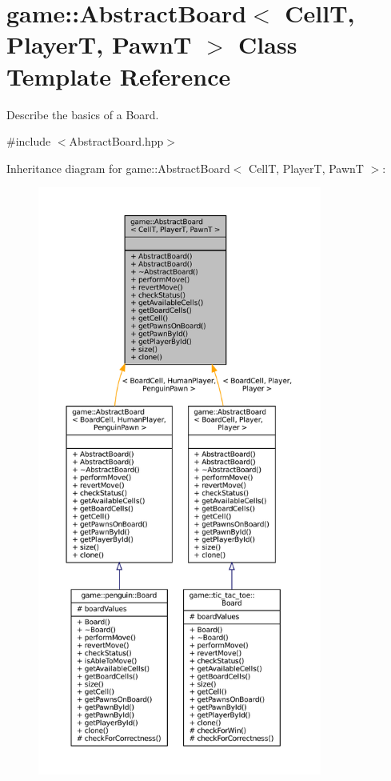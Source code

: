 \hypertarget{classgame_1_1_abstract_board}{}\section{game\+:\+:Abstract\+Board$<$ CellT, PlayerT, PawnT $>$ Class Template Reference}
\label{classgame_1_1_abstract_board}


Describe the basics of a Board.  




{\ttfamily \#include $<$Abstract\+Board.\+hpp$>$}



Inheritance diagram for game\+:\+:Abstract\+Board$<$ CellT, PlayerT, PawnT $>$\+:
\nopagebreak
\begin{figure}[H]
\begin{center}
\leavevmode
\includegraphics[height=550pt]{classgame_1_1_abstract_board__inherit__graph}
\end{center}
\end{figure}


